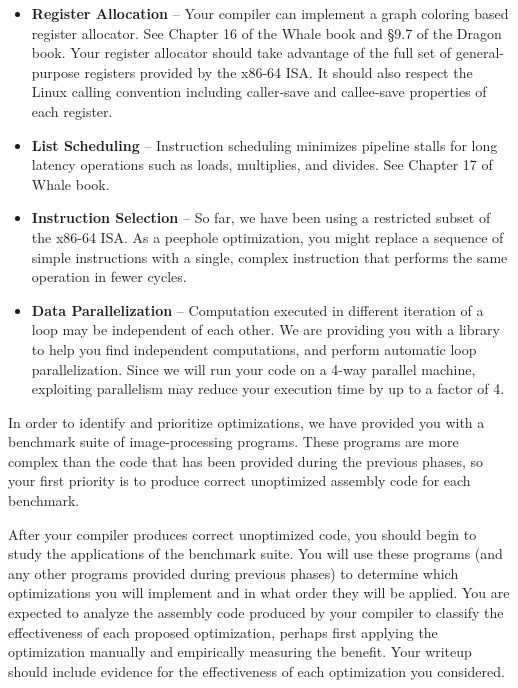 \begin{itemize}

\item {\bf Register Allocation} -- Your compiler can implement a graph
coloring based register allocator.  See Chapter 16 of the Whale book
and \S 9.7 of the Dragon book. Your register allocator should take
advantage of the full set of general-purpose registers provided by the
x86-64 ISA.  It should also respect the Linux calling convention
including caller-save and callee-save properties of each register.

\item {\bf List Scheduling} --  Instruction scheduling minimizes
pipeline stalls for long latency operations such as loads, multiplies,
and divides.  See Chapter 17 of Whale book.

\item {\bf Instruction Selection} -- So far, we have been using a
restricted subset of the x86-64 ISA.  As a peephole optimization,
you might replace a sequence of simple instructions with a single,
complex instruction that performs the same operation in fewer
cycles.

\item {\bf Data Parallelization} -- Computation executed in
different iteration of a loop may be independent of each other. We
are providing you with a library to help you find independent
computations, and perform automatic loop parallelization. Since we
will run your code on a 4-way parallel machine, exploiting
parallelism may reduce your execution time by up to a factor of 4.
\end{itemize}

In order to identify and prioritize optimizations, we have provided
you with a benchmark suite of image-processing programs.  These
programs are more complex than the code that has been provided during
the previous phases, so your first priority is to produce correct
unoptimized assembly code for each benchmark.

After your compiler produces correct unoptimized code, you should
begin to study the applications of the benchmark suite.  You will use
these programs (and any other programs provided during previous
phases) to determine which optimizations you will implement and in
what order they will be applied.  You are expected to analyze the
assembly code produced by your compiler to classify the effectiveness
of each proposed optimization, perhaps first applying the optimization
manually and empirically measuring the benefit. Your writeup should
include evidence for the effectiveness of each optimization you
considered.

